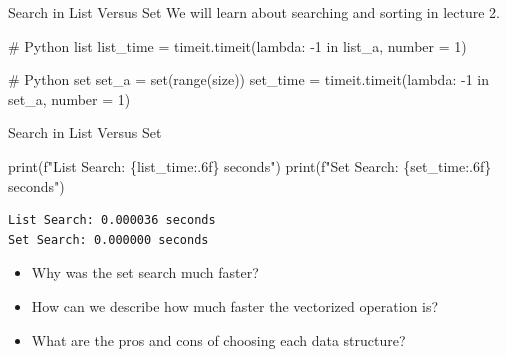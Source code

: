 \documentclass[
  ignorenonframetext,
]{beamer}
\newenvironment{Shaded}{\begin{snugshade}}{\end{snugshade}}
\newcommand{\BuiltInTok}[1]{\textcolor[rgb]{0.00,0.23,0.31}{#1}}
\newcommand{\CommentTok}[1]{\textcolor[rgb]{0.37,0.37,0.37}{#1}}
\newcommand{\DecValTok}[1]{\textcolor[rgb]{0.68,0.00,0.00}{#1}}
\newcommand{\KeywordTok}[1]{\textcolor[rgb]{0.00,0.23,0.31}{#1}}
\newcommand{\NormalTok}[1]{\textcolor[rgb]{0.00,0.23,0.31}{#1}}
\newcommand{\OperatorTok}[1]{\textcolor[rgb]{0.37,0.37,0.37}{#1}}
\newcommand{\SpecialCharTok}[1]{\textcolor[rgb]{0.37,0.37,0.37}{#1}}
\newcommand{\SpecialStringTok}[1]{\textcolor[rgb]{0.13,0.47,0.30}{#1}}
\begin{document}
\begin{frame}[fragile]{Search in List Versus Set}
\protect\hypertarget{search-in-list-versus-set}{}
We will learn about searching and sorting in lecture 2.

\begin{Shaded}
\begin{Highlighting}[]
\CommentTok{\# Python list}
\NormalTok{list\_time }\OperatorTok{=}\NormalTok{ timeit.timeit(}\KeywordTok{lambda}\NormalTok{:}
  \OperatorTok{{-}}\DecValTok{1} \KeywordTok{in}\NormalTok{ list\_a, number }\OperatorTok{=} \DecValTok{1}\NormalTok{)}
  
\CommentTok{\# Python set}
\NormalTok{set\_a }\OperatorTok{=} \BuiltInTok{set}\NormalTok{(}\BuiltInTok{range}\NormalTok{(size))}
\NormalTok{set\_time }\OperatorTok{=}\NormalTok{ timeit.timeit(}\KeywordTok{lambda}\NormalTok{:}
  \OperatorTok{{-}}\DecValTok{1} \KeywordTok{in}\NormalTok{ set\_a, number }\OperatorTok{=} \DecValTok{1}\NormalTok{)}
\end{Highlighting}
\end{Shaded}
\end{frame}

\begin{frame}[fragile]{Search in List Versus Set}
\protect\hypertarget{search-in-list-versus-set-1}{}
\begin{Shaded}
\begin{Highlighting}[]
\BuiltInTok{print}\NormalTok{(}\SpecialStringTok{f"List Search: }\SpecialCharTok{\{}\NormalTok{list\_time}\SpecialCharTok{:.6f\}}\SpecialStringTok{ seconds"}\NormalTok{)}
\BuiltInTok{print}\NormalTok{(}\SpecialStringTok{f"Set Search: }\SpecialCharTok{\{}\NormalTok{set\_time}\SpecialCharTok{:.6f\}}\SpecialStringTok{ seconds"}\NormalTok{)}
\end{Highlighting}
\end{Shaded}

\begin{verbatim}
List Search: 0.000036 seconds
Set Search: 0.000000 seconds
\end{verbatim}

\begin{itemize}
\item
  Why was the set search much faster?
\item
  How can we describe how much faster the vectorized operation is?
\item
  What are the pros and cons of choosing each data structure?
\end{itemize}
\end{frame}
\end{document}
